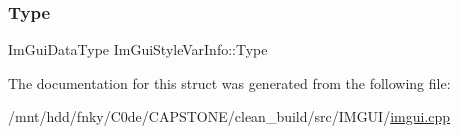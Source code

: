 \mbox{\label{structImGuiStyleVarInfo_a62f42d2bb7b71b7530493e16e622cb81}} 
\subsubsection{\texorpdfstring{Type}{Type}}
{\footnotesize\ttfamily Im\+Gui\+Data\+Type Im\+Gui\+Style\+Var\+Info\+::\+Type}



The documentation for this struct was generated from the following file\+:\begin{DoxyCompactItemize}
\item 
/mnt/hdd/fnky/\+C0de/\+C\+A\+P\+S\+T\+O\+N\+E/clean\+\_\+build/src/\+I\+M\+G\+U\+I/\hyperlink{imgui_8cpp}{imgui.\+cpp}\end{DoxyCompactItemize}
